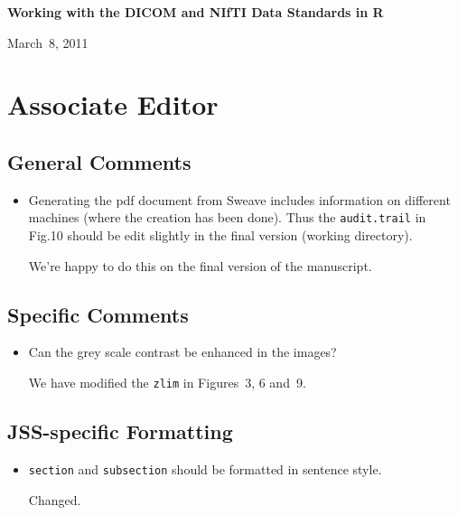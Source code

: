\documentclass[11pt]{article}
\begin{document}

\begin{center}
{\Large \textbf{Working with the {DICOM} and {NIfTI} Data Standards in \textsf{R}}}

\bigskip

March~8, 2011

\end{center}

\section*{Associate Editor}

\subsection*{General Comments}

\begin{itemize}
  
\item Generating the pdf document from Sweave includes information on
  different machines (where the creation has been done). Thus the
  \texttt{audit.trail} in Fig.10 should be edit slightly in the final
  version (working directory).
  
  We're happy to do this on the final version of the manuscript.
  
\end{itemize}

\subsection*{Specific Comments}

\begin{itemize}
  
\item Can the grey scale contrast be enhanced in the images?

  We have modified the \texttt{zlim} in Figures~3, 6 and~9.

\end{itemize}

\subsection*{JSS-specific Formatting}

\begin{itemize}
  
\item \texttt{section} and \texttt{subsection} should be formatted in
  sentence style.
  
  Changed.

\end{itemize}
\end{document}
